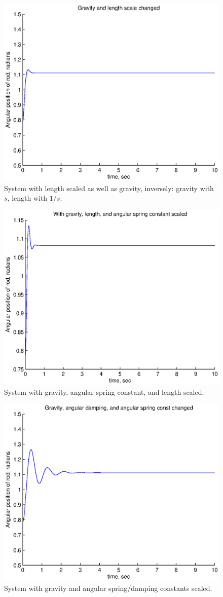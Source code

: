 \documentclass[12pt,letterpaper]{article}
\begin{document}
\begin{figure}[ht]
  \centering
  \includegraphics[width=.48\linewidth]{img/l_g_inverse_angular.eps}
  \caption{System with length scaled as well as gravity, inversely: gravity with $s$, length with $1/s$. }
  \label{fig:l_g_inverse_angular}
\end{figure}

\begin{figure}[ht]
  \centering
  \includegraphics[width=.48\linewidth]{img/k_l_g_angular.eps}
  \caption{System with gravity, angular spring constant, and length scaled. }
  \label{fig:k_l_g_angular}
\end{figure}

\begin{figure}[ht]
  \centering
  \includegraphics[width=.48\linewidth]{img/k_c_g_angular.eps}
  \caption{System with gravity and angular spring/damping constants scaled. }
  \label{fig:k_c_g_angular}
\end{figure}
\end{document}
